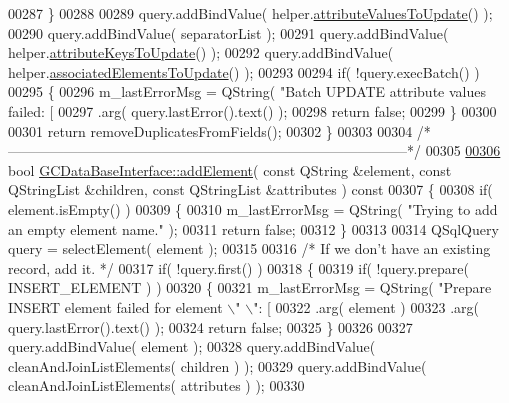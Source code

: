 \begin{DoxyCode}
{{{{{{{{{{{00287   \}
00288 
00289   query.addBindValue( helper.\hyperlink{class_g_c_batch_processor_helper_a390cab72c76739bea0d98d5ba1ff7e21}{attributeValuesToUpdate}() );
00290   query.addBindValue( separatorList );
00291   query.addBindValue( helper.\hyperlink{class_g_c_batch_processor_helper_a4cad81bffaa5af1531a72ccaeaedd600}{attributeKeysToUpdate}() );
00292   query.addBindValue( helper.\hyperlink{class_g_c_batch_processor_helper_a22c3d5f21c3dff029e89536c0a08daf4}{associatedElementsToUpdate}() );
00293 
00294   \textcolor{keywordflow}{if}( !query.execBatch() )
00295   \{
00296     m\_lastErrorMsg = QString( \textcolor{stringliteral}{"Batch UPDATE attribute values failed: [%
00297         .arg( query.lastError().text() );
00298     \textcolor{keywordflow}{return} \textcolor{keyword}{false};
00299   \}
00300 
00301   \textcolor{keywordflow}{return} removeDuplicatesFromFields();
00302 \}
00303 
00304 \textcolor{comment}{/*
      --------------------------------------------------------------------------------------*/}
00305 
\hypertarget{gcdatabaseinterface_8cpp_source_l00306}{}\hyperlink{class_g_c_data_base_interface_a650cbb413d65c7b2f76fb4c8621295f7}{00306} \textcolor{keywordtype}{bool} \hyperlink{class_g_c_data_base_interface_a650cbb413d65c7b2f76fb4c8621295f7}{GCDataBaseInterface::addElement}( \textcolor{keyword}{const} QString &element, \textcolor{keyword}{const} QStringList
       &children, \textcolor{keyword}{const} QStringList &attributes )\textcolor{keyword}{ const}
00307 \textcolor{keyword}{}\{
00308   \textcolor{keywordflow}{if}( element.isEmpty() )
00309   \{
00310     m\_lastErrorMsg = QString( \textcolor{stringliteral}{"Trying to add an empty element name."} );
00311     \textcolor{keywordflow}{return} \textcolor{keyword}{false};
00312   \}
00313 
00314   QSqlQuery query = selectElement( element );
00315 
00316   \textcolor{comment}{/* If we don't have an existing record, add it. */}
00317   \textcolor{keywordflow}{if}( !query.first() )
00318   \{
00319     \textcolor{keywordflow}{if}( !query.prepare( INSERT\_ELEMENT ) )
00320     \{
00321       m\_lastErrorMsg = QString( \textcolor{stringliteral}{"Prepare INSERT element failed for element \(\backslash\)"%
      \(\backslash\)": [%
00322           .arg( element )
00323           .arg( query.lastError().text() );
00324       \textcolor{keywordflow}{return} \textcolor{keyword}{false};
00325     \}
00326 
00327     query.addBindValue( element );
00328     query.addBindValue( cleanAndJoinListElements( children ) );
00329     query.addBindValue( cleanAndJoinListElements( attributes ) );
00330 
}}}}}}}}}}}}}
\end{DoxyCode}
